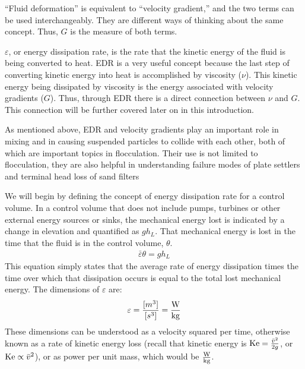 \documentclass[letterpaper,10pt,english]{sphinxmanual}
\begin{document}
 “Fluid deformation” is equivalent to “velocity gradient,” and the two terms can be used interchangeably. They are different ways of thinking about the same concept. Thus, \(G\) is the measure of both terms.

\(\varepsilon\), or energy dissipation rate, is the rate that the kinetic energy of the fluid is being converted to heat. EDR is a very useful concept because the last step of converting kinetic energy into heat is accomplished by viscosity (\(\nu\)). This kinetic energy being dissipated by viscosity is the energy associated with velocity gradients (\(G\)). Thus, through EDR there is a direct connection between \(\nu\) and \(G\). This connection will be further covered later on in this introduction.

As mentioned above, EDR and velocity gradients play an important role in mixing and in causing suspended particles to collide with each other, both of which are important topics in flocculation. Their use is not limited to flocculation, they are also helpful in understanding failure modes of plate settlers and terminal head loss of sand filters

We will begin by defining the concept of energy dissipation rate for a control volume. In a control volume that does not include pumps, turbines or other external energy sources or sinks, the mechanical energy lost is indicated by a change in elevation and quantified as \(g h_L\). That mechanical energy is lost in the time that the fluid is in the control volume, \(\theta\).
\begin{equation}\label{equation:Rapid_Mix/RM_Intro:Rapid_Mix/RM_Intro:0}
\begin{split}\bar\varepsilon \theta = g h_L\end{split}
\end{equation}
This equation simply states that the average rate of energy dissipation times the time over which that dissipation occurs is equal to the total lost mechanical energy. The dimensions of \(\varepsilon\) are:
\begin{equation}\label{equation:Rapid_Mix/RM_Intro:Rapid_Mix/RM_Intro:1}
\begin{split}\varepsilon = \frac{[m^3]}{[s^3]} = {\rm \frac{W}{kg}}\end{split}
\end{equation}
These dimensions can be understood as a velocity squared per time, otherwise known as a rate of kinetic energy loss (recall that kinetic energy is \({\rm Ke} = \frac{\bar v^2}{2g}\), or \({\rm Ke} \propto \bar v^2\)), or as power per unit mass, which would be \({\rm  \frac{W}{kg}}\).
\end{document}
